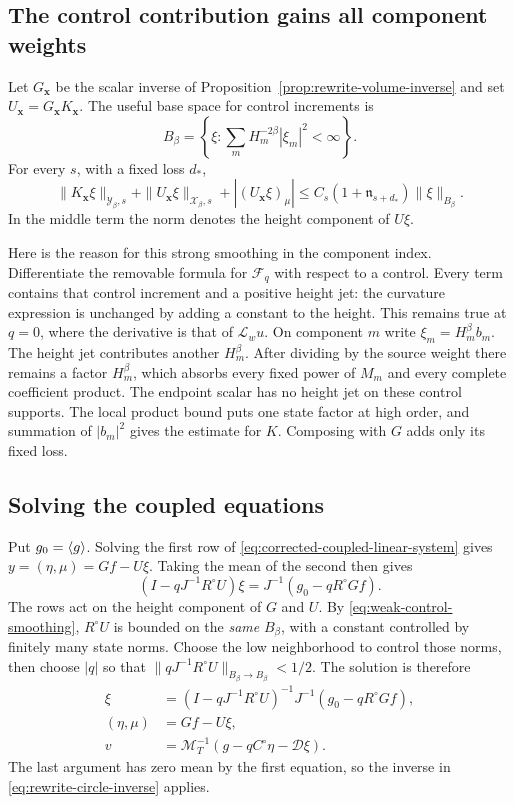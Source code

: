 \subsection{The control contribution gains all component weights}

Let $G_{\mathbf x}$ be the scalar inverse of
Proposition~\ref{prop:rewrite-volume-inverse} and set
$U_{\mathbf x}=G_{\mathbf x}K_{\mathbf x}$.
The useful base space for control increments is
\[
 B_\beta=\left\{\xi:\sum_mH_m^{-2\beta}|\xi_m|^2<\infty\right\}.
\]
For every $s$, with a fixed loss $d_*$,
\begin{equation}\label{eq:weak-control-smoothing}
 \|K_{\mathbf x}\xi\|_{\mathcal Y_\beta,s}
 +\|U_{\mathbf x}\xi\|_{\mathcal X_\beta,s}\!+|(U_{\mathbf x}\xi)_{\mu}|
 \le C_s(1+\mathfrak n_{s+d_*})\|\xi\|_{B_\beta}.
\end{equation}
In the middle term the norm denotes the height component of $U\xi$.

Here is the reason for this strong smoothing in the component index.
Differentiate the removable formula for $\mathcal F_q$ with respect
to a control. Every term contains that control increment and a
positive height jet: the curvature expression is unchanged by adding
a constant to the height. This remains true at $q=0$, where the
derivative is that of $\mathscr L_wu$. On component $m$ write
$\xi_m=H_m^\beta b_m$. The height jet contributes another
$H_m^\beta$. After dividing by the source weight there remains a
factor $H_m^\beta$, which absorbs every fixed power of $M_m$ and
every complete coefficient product. The endpoint scalar has no
height jet on these control supports. The local product bound puts
one state factor at high order, and summation of $|b_m|^2$ gives the
estimate for $K$. Composing with $G$ adds only its fixed loss.

\subsection{Solving the coupled equations}

Put $g_0=\langle g\rangle$. Solving the first row of
\eqref{eq:corrected-coupled-linear-system} gives
$y=(\eta,\mu)=Gf-U\xi$. Taking the mean of the second then gives
\[
 (I-qJ^{-1}R^\circ U)\xi
              =J^{-1}(g_0-qR^\circ Gf).
\]
The rows act on the height component of $G$ and $U$.
By \eqref{eq:weak-control-smoothing}, $R^\circ U$ is bounded on
the \emph{same} $B_\beta$, with a constant controlled by finitely
many state norms. Choose the low neighborhood to control those norms,
then choose $|q|$ so that
$\|qJ^{-1}R^\circ U\|_{B_\beta\to B_\beta}<1/2$.
The solution is therefore
\begin{equation}\label{eq:joint-height-circle-inverse}
 \begin{split}
 \xi&=(I-qJ^{-1}R^\circ U)^{-1}J^{-1}(g_0-qR^\circ Gf),\\
 (\eta,\mu)&=Gf-U\xi,\\
 v&=\mathcal M_T^{-1}(g-qC^\circ\eta-\mathcal D\xi).
 \end{split}
\end{equation}
The last argument has zero mean by the first equation, so the inverse
in \eqref{eq:rewrite-circle-inverse} applies.

